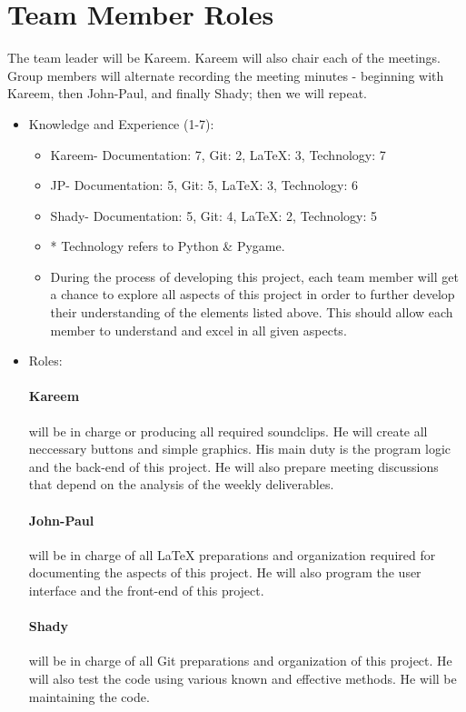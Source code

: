 \documentclass{article}
\begin{document}
\section{Team Member Roles}
The team leader will be Kareem. Kareem will also chair each of the meetings. Group members will alternate recording the meeting minutes - beginning with Kareem, then John-Paul, and finally Shady; then we will repeat.
\\
\begin{itemize}
\item Knowledge and Experience (1-7):
\begin{itemize}
\item Kareem- Documentation: 7, Git: 2, LaTeX: 3, Technology: 7
\item  JP- Documentation: 5, Git: 5, LaTeX: 3, Technology: 6
\item Shady- Documentation: 5, Git: 4, LaTeX: 2, Technology: 5
\item * Technology refers to Python \& Pygame.
\item During the process of developing this project, each team member will get a chance to explore all aspects of this project in order to further develop their understanding of the elements listed above. This should allow each member to understand and excel in all given aspects. 
\end{itemize}
\item Roles: 
\paragraph{Kareem}
will be in charge or producing all required soundclips. He will create all neccessary buttons and simple graphics.
His main duty is the program logic and the back-end of this project. He will also prepare meeting discussions that depend on the
analysis of the weekly deliverables.

\paragraph{John-Paul}
will be in charge of all LaTeX preparations and organization required for documenting the aspects of this project.
He will also program the user interface and the front-end of this project.

\paragraph{Shady}
will be in charge of all Git preparations and organization of this project. He will also test the code using various known and effective
methods. He will be maintaining the code.
\end{itemize}
\end{document}
